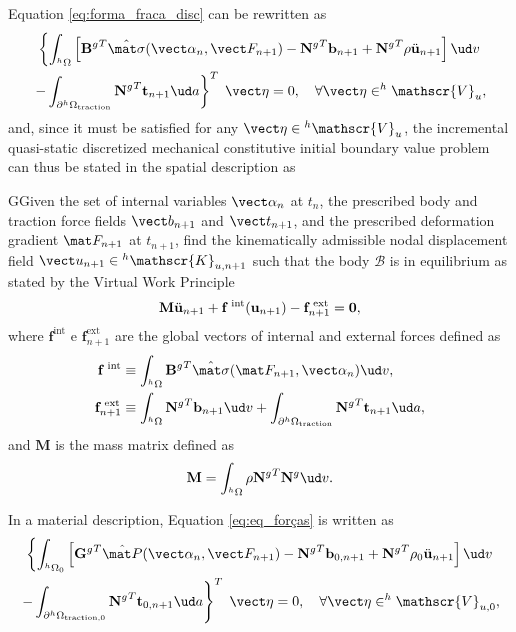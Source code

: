 Equation \eqref{eq:forma_fraca_disc} can be rewritten as
\begin{multline}
    \left\{  \int_{^h\Omega}\left[{\mathbf B^g}^T \hat{\mat \sigma}(\vect \alpha_n, \vect F_{n+1})-{\mathbf N^g}^T\mathbf b_{n+1} +{\mathbf N^g}^T\rho\ddot{\mathbf u}_{n+1} \right]\ud v \right. \\ \left. -\int_{\partial ^h\Omega_\text{traction}} {\mathbf N^g}^T \mathbf t_{n+1}\ud a\right\}^T\;\vect \eta =0,\quad \forall \vect \eta \in ^h \mathscr{V}_u, \label{eq:eq_forças}
\end{multline}
and, since it must be satisfied for any $\vect \eta \in {}^h \mathscr{V}_u$, the incremental quasi-static discretized mechanical constitutive initial boundary value problem can thus be stated in the spatial description as
\begin{problem}
GGiven the set of internal variables $\vect \alpha_n$ at $t_n$, the prescribed body and traction force fields $\vect b_{n+1}$ and $\vect t_{n+1}$, and the prescribed deformation gradient $\mat F_{n+1}$ at $t_{n+1}$, find the kinematically admissible nodal displacement field $\vect u_{n+1}\in {^h\mathscr{K}_{u,n+1}}$ such that the body $\mathscr{B}$ is in equilibrium as stated by the Virtual Work Principle
\begin{equation}
    \mathbf M \ddot{\mathbf u}_{n+1} + \mathbf f^\text{\;int}(\mathbf u_{n+1})-\mathbf f^\text{\;ext}_{n+1}=\mathbf 0, \label{eq:equilibrium_spatial}
\end{equation}
where $\mathbf f^\text{int}$ e $\mathbf f^\text{ext}_{n+1}$ are the global vectors of internal and external forces defined as
\begin{align}
    \mathbf f^\text{\;int} &\equiv \int_{^h\Omega}{\mathbf B^g}^T \hat{\mat \sigma}(\mat F_{n+1}, \vect \alpha_n)\ud v,\\
    \mathbf f^\text{\;ext}_{n+1} &\equiv \int_{^h\Omega}{\mathbf N^g}^T \mathbf b_{n+1}\ud v + \int_{\partial^h\Omega_\text{traction}}{\mathbf N^g}^T \mathbf t_{n+1}\ud a,
\end{align}
and $\mathbf M$ is the mass matrix defined as
\begin{equation}
  \mathbf M = \int_{{}^h\Omega} \rho {\mathbf{N}^g}^T\mathbf{N}^g \ud v.
\end{equation}
\end{problem}
In a material description, Equation \eqref{eq:eq_forças} is written as
\begin{multline}
     \left\{  \int_{^h\Omega_0}\left[{\mathbf G^g}^T \hat{\mat P}(\vect \alpha_n, \vect F_{n+1})-{\mathbf N^g}^T \mathbf b_{0,n+1} + {\mathbf N^g}^T \rho_0\ddot{\mathbf u}_{n+1} \right]\ud v \right.\\ \left.   -\int_{\partial ^h\Omega_\text{traction,0}} {\mathbf N^g}^T \mathbf t_{0,n+1}\ud a\right\}^T\;\vect \eta =0,\quad \forall \vect \eta \in ^h \mathscr{V}_{u,0},
\end{multline}

